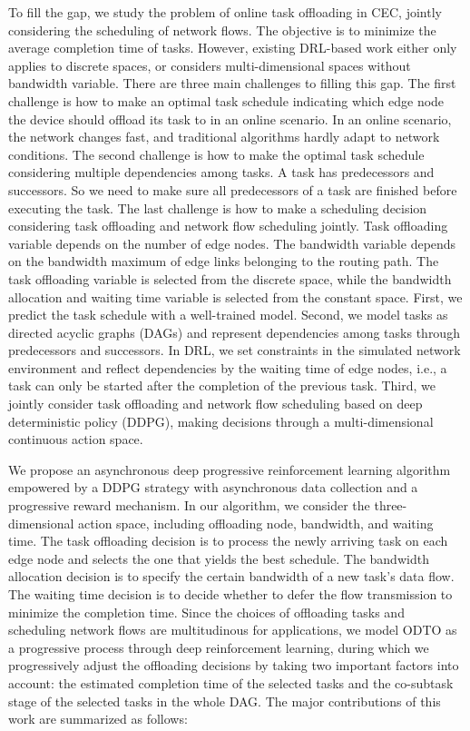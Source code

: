 \documentclass[10pt, conference, letterpaper]{IEEEtran}
\begin{document}
To fill the gap, we study the problem of online task offloading in CEC, jointly considering the scheduling of network flows. The objective is to minimize the average completion time of tasks. However, existing DRL-based work \cite{tang2020deep,wang2021dependent,zou2020a3c,bi2021lyapunov,wang2021computation} either only applies to discrete spaces, or considers multi-dimensional spaces without bandwidth variable. There are three main challenges to filling this gap. The first challenge is how to make an optimal task schedule indicating which edge node the device should offload its task to in an online scenario. In an online scenario, the network changes fast, and traditional algorithms hardly adapt to network conditions. The second challenge is how to make the optimal task schedule considering multiple dependencies among tasks. A task has predecessors and successors. So we need to make sure all predecessors of a task are finished before executing the task. The last challenge is how to make a scheduling decision considering task offloading and network flow scheduling jointly. Task offloading variable depends on the number of edge nodes. The bandwidth variable depends on the bandwidth maximum of edge links belonging to the routing path. The task offloading variable is selected from the discrete space, while the bandwidth allocation and waiting time variable is selected from the constant space. First, we predict the task schedule with a well-trained model. Second, we model tasks as directed acyclic graphs (DAGs) and represent dependencies among tasks through predecessors and successors. In DRL, we set constraints in the simulated network environment and reflect dependencies by the waiting time of edge nodes, i.e., a task can only be started after the completion of the previous task. Third, we jointly consider task offloading and network flow scheduling based on deep deterministic policy (DDPG), making decisions through a multi-dimensional continuous action space. 

We propose an asynchronous deep progressive reinforcement learning algorithm empowered by a DDPG strategy with asynchronous data collection and a progressive reward mechanism. In our algorithm, we consider the three-dimensional action space, including offloading node, bandwidth, and waiting time. The task offloading decision is to process the newly arriving task on each edge node and selects the one that yields the best schedule. The bandwidth allocation decision is to specify the certain bandwidth of a new task's data flow. The waiting time decision is to decide whether to defer the flow transmission to minimize the completion time. Since the choices of offloading tasks and scheduling network flows are multitudinous for applications, we model ODTO as a progressive process through deep reinforcement learning, during which we progressively adjust the offloading decisions by taking two important factors into account: the estimated completion time of the selected tasks and the co-subtask stage of the selected tasks in the whole DAG. The major contributions of this work are summarized as follows:
\end{document}
